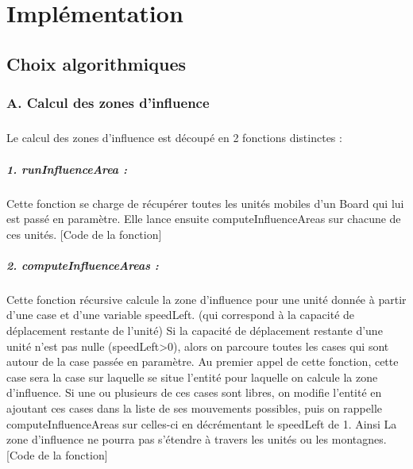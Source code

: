 \chapter{Implémentation}
	
	\section{Choix algorithmiques}

		\subsection{A. Calcul des zones d'influence}
		
			\paragraph{}
			Le calcul des zones d'influence est découpé en 2 fonctions distinctes :
			
			\paragraph{1. runInfluenceArea : }
			Cette fonction se charge de récupérer toutes les unités mobiles d'un Board qui lui est passé en paramètre.
			Elle lance ensuite computeInfluenceAreas sur chacune de ces unités.
			[Code de la fonction]
			
			\paragraph{2. computeInfluenceAreas : }
			Cette fonction récursive calcule la zone d'influence pour une unité donnée à partir d'une case et d'une variable speedLeft. 
			(qui correspond à la capacité de déplacement restante de l'unité)
			Si la capacité de déplacement restante d'une unité n'est pas nulle (speedLeft\textgreater0), alors on parcoure toutes les cases 
			qui sont autour de la case passée en paramètre. 
			Au premier appel de cette fonction, cette case sera la case sur laquelle se situe l'entité pour laquelle on calcule la zone d'influence.
			Si une ou plusieurs de ces cases sont libres, on modifie l'entité en ajoutant ces cases dans la liste de ses mouvements possibles, 
			puis on rappelle computeInfluenceAreas sur celles-ci en décrémentant le speedLeft de 1.
			Ainsi La zone d'influence ne pourra pas s'étendre à travers les unités ou les montagnes.
			[Code de la fonction]
		
